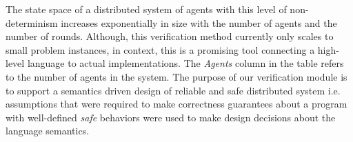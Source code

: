  The state space of a distributed system of agents with this level of non-determinism increases exponentially in size with the number of agents and the number of rounds. Although, this verification method currently only scales to small problem instances, in context, this is a promising tool connecting a high-level language to actual implementations. The \emph{Agents} column in the table refers to the number of agents in the system. The purpose of our verification module is to support a semantics driven design of reliable and safe distributed system i.e. assumptions that were required to make correctness guarantees about a program with well-defined \emph{safe} behaviors were used to make design decisions about the language semantics. 
 






 



